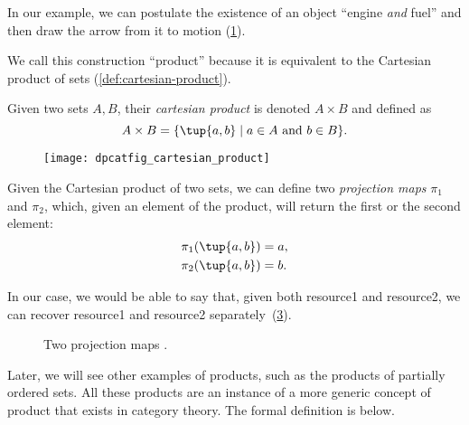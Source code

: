 In our example, we can postulate the existence of an object ``engine \emph{and}
fuel'' and then draw the arrow from it to motion (\cref{fig:e13}).

\begin{figure}[h!]
    \centering
    \caption{\label{fig:e13} 
    }
\end{figure}

We call this construction ``product'' because it is equivalent to
the Cartesian product of sets (\cref{def:cartesian-product}).

\begin{definition}
\label{def:cartesian-product}
   Given two sets $A,B$, their \emph{cartesian product} is denoted $A\times  B$
   and defined as 
   \begin{equation}
       A\times  B=\{ \tup{a,b}\mid a\in A\text{ and } b\in B\}.
   \end{equation}
\end{definition}

\begin{figure}[h!]
    \centering
    \texttt{[image: dpcatfig\_cartesian\_product]}
    \caption{\label{fig:cartesian-product}}
\end{figure}

Given the Cartesian product of two sets, we can define two \emph{projection maps} $\pi_1$
and $\pi_2$, which, given an element of the product, will return the first or the second
element:
\begin{equation}
\begin{aligned}
    \pi_1(\tup{a,b}) &= a,\\
    \pi_2(\tup{a,b}) &= b.
\end{aligned}
\end{equation}

In our case, we would be able to say that, given both resource1 and resource2,
we can recover resource1 and resource2 separately~(\cref{fig:resource-product}).

\begin{figure}[h!]
    \centering
    \caption{Two projection maps \label{fig:resource-product}.}
\end{figure}


Later, we will see other examples of products, such as the products of partially ordered sets.
All these products are an instance of a more generic concept of product that exists in category
theory.  The formal definition is below.
 
